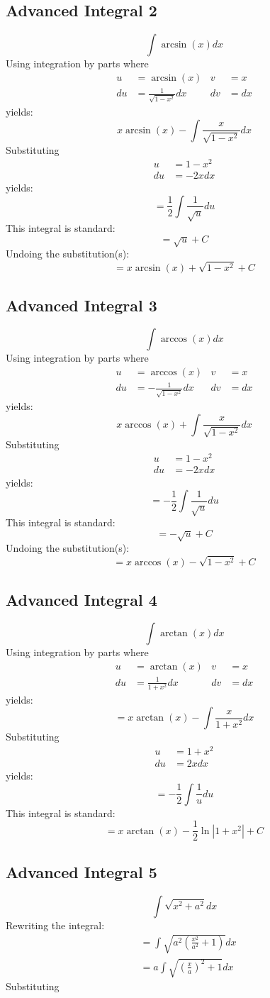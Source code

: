 \documentclass{article}
\begin{document}
\subsection*{Advanced Integral 2}
$$\int\arcsin(x)dx$$
Using integration by parts where
\begin{align*}
u&=\arcsin(x) &v&=x \\
du&=\frac{1}{\sqrt{1-x^2}}dx &dv&=dx
\end{align*}
yields:
$$x\arcsin(x)-\int\frac{x}{\sqrt{1-x^2}}dx$$
Substituting
\begin{align*}
u&=1-x^2 \\
du&=-2xdx
\end{align*}
yields:
$$=\frac{1}{2}\int\frac{1}{\sqrt{u}}du$$
This integral is standard:
$$=\sqrt{u}+C$$
Undoing the substitution(s):
$$=x\arcsin(x)+\sqrt{1-x^2}+C$$
\subsection*{Advanced Integral 3}
$$\int\arccos(x)dx$$
Using integration by parts where
\begin{align*}
u&=\arccos(x) &v&=x \\
du&=-\frac{1}{\sqrt{1-x^2}}dx &dv&=dx
\end{align*}
yields:
$$x\arccos(x)+\int\frac{x}{\sqrt{1-x^2}}dx$$
Substituting
\begin{align*}
u&=1-x^2 \\
du&=-2xdx
\end{align*}
yields:
$$=-\frac{1}{2}\int\frac{1}{\sqrt{u}}du$$
This integral is standard:
$$=-\sqrt{u}+C$$
Undoing the substitution(s):
$$=x\arccos(x)-\sqrt{1-x^2}+C$$
\subsection*{Advanced Integral 4}
$$\int\arctan(x)dx$$
Using integration by parts where
\begin{align*}
u&=\arctan(x) &v&=x \\
du&=\frac{1}{1+x^2}dx &dv&=dx
\end{align*}
yields:
$$=x\arctan(x)-\int\frac{x}{1+x^2}dx$$
Substituting
\begin{align*}
u&=1+x^2 \\
du&=2xdx
\end{align*}
yields:
$$=-\frac{1}{2}\int\frac{1}{u}du$$
This integral is standard:
$$=x\arctan(x)-\frac{1}{2}\ln\left|1+x^2\right|+C$$
\subsection*{Advanced Integral 5}
$$\int\sqrt{x^2+a^2}dx$$
Rewriting the integral:
\begin{align*}
&=\int\sqrt{a^2\left(\frac{x^2}{a^2}+1\right)}dx \\
&=a\int\sqrt{\left(\frac{x}{a}\right)^2+1}dx
\end{align*}
Substituting
$$$$
\end{document}

